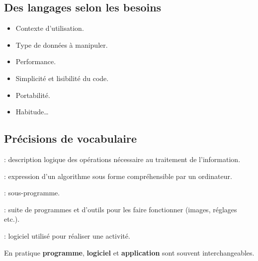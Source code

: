 \subsection{Des langages selon les besoins}
\begin{slide}
	\begin{itemize}
		\item Contexte d'utilisation.
		\item Type de données à manipuler.
		\item Performance.
		\item Simplicité et lisibilité du code.
		\item Portabilité.
		\item Habitude… 
	\end{itemize}
\end{slide}





\subsection{Précisions de vocabulaire}
\begin{slide}
	\small
	\begin{description}
	  \item[Algorithme] : description logique des opérations nécessaire au traitement de l'information.
		\item[Programme] : expression d'un algorithme sous forme compréhensible par un ordinateur.
		\item[Fonction] : sous-programme.
		\item[Logiciel] : suite de programmes et d'outils pour les faire fonctionner (images, réglages etc.).
		\item[Application] : logiciel utilisé pour réaliser une activité. %
		\item En pratique \textbf{programme}, \textbf{logiciel} et \textbf{application} sont souvent interchangeables.
	\end{description}

\end{slide}
